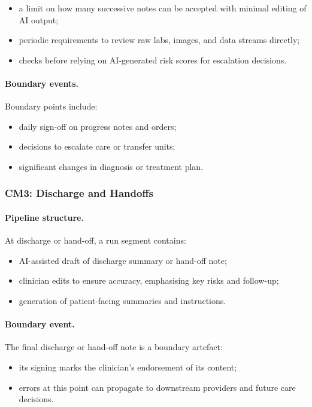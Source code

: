 \begin{itemize}
  \item a limit on how many successive notes can be accepted with minimal
        editing of AI output;
  \item periodic requirements to review raw labs, images, and data streams
        directly;
  \item checks before relying on AI-generated risk scores for escalation
        decisions.
\end{itemize}

\paragraph{Boundary events.}
Boundary points include:

\begin{itemize}
  \item daily sign-off on progress notes and orders;
  \item decisions to escalate care or transfer units;
  \item significant changes in diagnosis or treatment plan.
\end{itemize}

\subsubsection*{CM3: Discharge and Handoffs}

\paragraph{Pipeline structure.}
At discharge or hand-off, a run segment contains:

\begin{itemize}
  \item AI-assisted draft of discharge summary or hand-off note;
  \item clinician edits to ensure accuracy, emphasising key risks and follow-up;
  \item generation of patient-facing summaries and instructions.
\end{itemize}

\paragraph{Boundary event.}
The final discharge or hand-off note is a boundary artefact:

\begin{itemize}
  \item its signing marks the clinician’s endorsement of its content;
  \item errors at this point can propagate to downstream providers and
        future care decisions.
\end{itemize}

